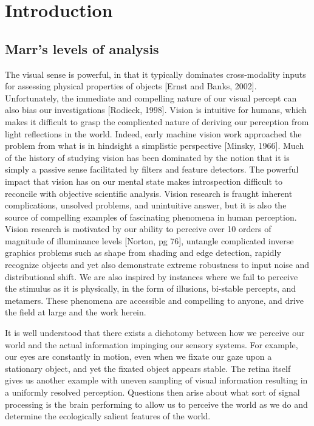 \chapter{Introduction}


\section{Marr's levels of analysis}
The visual sense is powerful, in that it typically dominates cross-modality inputs for assessing physical properties of objects [Ernst and Banks, 2002]. Unfortunately, the immediate and compelling nature of our visual percept can also bias our investigations [Rodieck, 1998]. Vision is intuitive for humans, which makes it difficult to grasp the complicated nature of deriving our perception from light reflections in the world. Indeed, early machine vision work approached the problem from what is in hindsight a simplistic perspective [Minsky, 1966]. Much of the history of studying vision has been dominated by the notion that it is simply a passive sense facilitated by filters and feature detectors. The powerful impact that vision has on our mental state makes introspection difficult to reconcile with objective scientific analysis. Vision research is fraught inherent complications, unsolved problems, and unintuitive answer, but it is also the source of compelling examples of fascinating phenomena in human perception. Vision research is motivated by our ability to perceive over 10 orders of magnitude of illuminance levels [Norton, pg 76], untangle complicated inverse graphics problems such as shape from shading and edge detection, rapidly recognize objects and yet also demonstrate extreme robustness to input noise and distributional shift. We are also inspired by instances where we fail to perceive the stimulus as it is physically, in the form of illusions, bi-stable percepts, and metamers. These phenomena are accessible and compelling to anyone, and drive the field at large and the work herein.

It is well understood that there exists a dichotomy between how we perceive our world and the actual information impinging our sensory systems. For example, our eyes are constantly in motion, even when we fixate our gaze upon a stationary object, and yet the fixated object appears stable. The retina itself gives us another example with uneven sampling of visual information resulting in a uniformly resolved perception. Questions then arise about what sort of signal processing is the brain performing to allow us to perceive the world as we do and determine the ecologically salient features of the world. 

